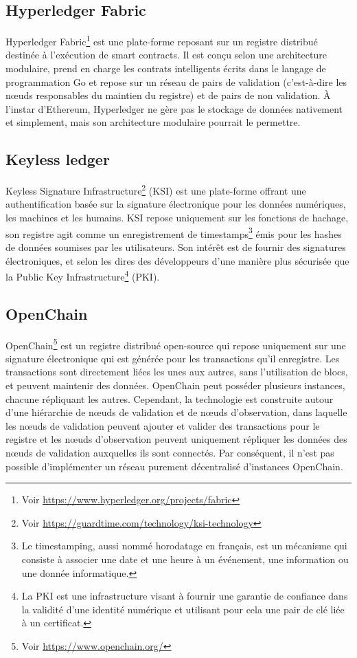 \documentclass{tnreport}
\begin{document}
\subsection{Hyperledger Fabric}

Hyperledger Fabric\footnote{Voir \url{https://www.hyperledger.org/projects/fabric}} est une plate-forme reposant sur un registre distribué destinée à l'exécution de smart contracts. Il est conçu selon une architecture modulaire, prend en charge les contrats intelligents écrits dans le langage de programmation Go et repose sur un réseau de pairs de validation (c'est-à-dire les nœuds responsables du maintien du registre) et de pairs de non validation. À l'instar d'Ethereum, Hyperledger ne gère pas le stockage de données nativement et simplement, mais son architecture modulaire pourrait le permettre.

\subsection{Keyless ledger}

Keyless Signature Infrastructure\footnote{Voir \url{https://guardtime.com/technology/ksi-technology}} (KSI) est une plate-forme offrant une authentification basée sur la signature électronique pour les données numériques, les machines et les humains. KSI repose uniquement sur les fonctions de hachage, son registre agit comme un enregistrement de timestamps\footnote{Le timestamping, aussi nommé horodatage en français, est un mécanisme qui consiste à associer une date et une heure à un événement, une information ou une donnée informatique.} émis pour les hashes de données soumises par les utilisateurs. Son intérêt est de fournir des signatures électroniques, et selon les dires des développeurs d'une manière plus sécurisée que la Public Key Infrastructure\footnote{La PKI est une infrastructure visant à fournir une garantie de confiance dans la validité d’une identité numérique et utilisant pour cela une pair de clé liée à un certificat.} (PKI).

\subsection{OpenChain}

OpenChain\footnote{Voir \url{https://www.openchain.org/}} est un registre distribué open-source qui repose uniquement sur une signature électronique qui est générée pour les transactions qu'il enregistre. Les transactions sont directement liées les unes aux autres, sans l'utilisation de blocs, et peuvent maintenir des données. OpenChain peut posséder plusieurs instances, chacune répliquant les autres. Cependant, la technologie est construite autour d'une hiérarchie de nœuds de validation et de nœuds d'observation, dans laquelle les nœuds de validation peuvent ajouter et valider des transactions pour le registre et les nœuds d'observation peuvent uniquement répliquer les données des nœuds de validation auxquelles ils sont connectés. Par conséquent, il n'est pas possible d'implémenter un réseau purement décentralisé d'instances OpenChain.
\end{document}
